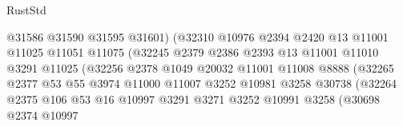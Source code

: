 \begin{lexlean}{RustStd}
\begin{coremodule}
                                      @31586
                                      @31590
                                      @31595
                                      @31601)
                                    (@32310
                                      @10976
                                      @2394
                                      @2420
                                      @13
                                      @11001
                                      @11025
                                      @11051
                                      @11075
                                      (@32245
                                        @2379
                                        @2386
                                        @2393
                                        @13
                                        @11001
                                        @11010
                                        @3291
                                        @11025
                                        (@32256
                                          @2378
                                          @1049
                                          @20032
                                          @11001
                                          @11008
                                          @8888
                                          (@32265
                                            @2377
                                            @53
                                            @55
                                            @3974
                                            @11000
                                            @11007
                                            @3252
                                            @10981
                                            @3258
                                            @30738
                                            (@32264
                                              @2375
                                              @106
                                              @53
                                              @16
                                              @10997
                                              @3291
                                              @3271
                                              @3252
                                              @10991
                                              @3258
                                              (@30698
                                                @2374
                                                @10997

\end{coremodule}
\end{lexlean}
